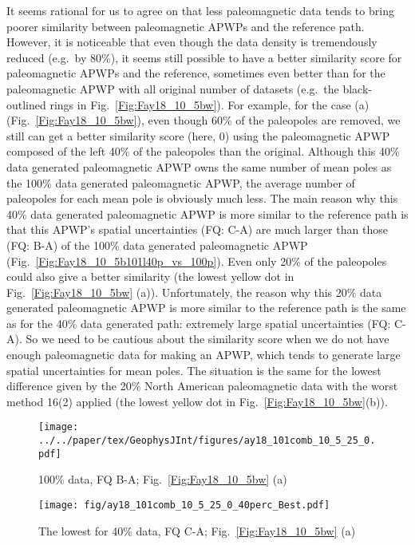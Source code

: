 It seems rational for us to agree on that less paleomagnetic data tends to bring
poorer similarity between paleomagnetic APWPs and the reference path. However,
it is noticeable that even though the data density is tremendously reduced
(e.g.\ by 80\%), it seems still possible to have a better similarity score for
paleomagnetic APWPs and the reference, sometimes even better than for the
paleomagnetic APWP with all original number of datasets (e.g.\ the
black-outlined rings in Fig.~\ref{Fig:Fay18_10_5bw}). For example, for the case
(a) (Fig.~\ref{Fig:Fay18_10_5bw}), even though 60\% of the paleopoles are
removed, we still can get a better similarity score (here, 0) using the
paleomagnetic APWP composed of the left 40\% of the paleopoles than the
original. Although this 40\% data generated paleomagnetic APWP owns the same
number of mean poles as the 100\% data generated paleomagnetic APWP, the average
number of paleopoles for each mean pole is obviously much less. The main reason
why this 40\% data generated paleomagnetic APWP is more similar to the reference
path is that this APWP's spatial uncertainties (FQ: C-A) are much larger than
those (FQ: B-A) of the 100\% data generated paleomagnetic APWP
(Fig.~\ref{Fig:Fay18_10_5b101l40p_vs_100p}). Even only 20\% of the paleopoles
could also give a better similarity (the lowest yellow dot in
Fig.~\ref{Fig:Fay18_10_5bw} (a)). Unfortunately, the reason why this 20\% data
generated paleomagnetic APWP is more similar to the reference path is the same
as for the 40\% data generated path: extremely large spatial uncertainties (FQ:
C-A). So we need to be cautious about the similarity score when we do not have
enough paleomagnetic data for making an APWP, which tends to generate large
spatial uncertainties for mean poles. The situation is the same for the lowest
difference given by the 20\% North American paleomagnetic data with the worst
method 16(2) applied (the lowest yellow dot in Fig.~\ref{Fig:Fay18_10_5bw}(b)).

\begin{figure*}[tbp]
  \captionsetup[subfigure]{labelformat=empty,aboveskip=-6pt,belowskip=-6pt}
  \centering
  \begin{subfigure}[htbp]{.49\textwidth}
    \captionsetup{skip=0pt}  %
    \centering
    \texttt{[image: ../../paper/tex/GeophysJInt/figures/ay18\_101comb\_10\_5\_25\_0.pdf]}
	\caption{100\% data, FQ B-A; Fig.~\ref{Fig:Fay18_10_5bw}
	(a)}\label{Fig:Fay18_10_5b101}
  \end{subfigure}
  \begin{subfigure}[htbp]{.49\textwidth}
    \captionsetup{skip=0pt}
    \centering
    \texttt{[image: fig/ay18\_101comb\_10\_5\_25\_0\_40perc\_Best.pdf]}
    \caption{The lowest for 40\% data, FQ C-A;
	Fig.~\ref{Fig:Fay18_10_5bw} (a)}\label{Fig:Fay18_10_5b101l40p}
  \end{subfigure}
  \caption[Less data, better similarity?]{Comparing the 100\% North American
  120 Ma paleomagnetic data derived result with the best of the only
  40\% data (giving even better similarity) derived results (the lowest yellow
  dot in Fig.~\ref{Fig:Fay18_10_5bw} (a)).}\label{Fig:Fay18_10_5b101l40p_vs_100p}
\end{figure*}

